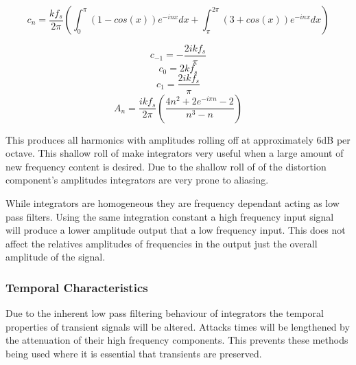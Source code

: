 			\[ c_{n} = \frac{kf_{s}}{2\pi} \left( \int_{0}^{\pi} (1 - cos(x))e^{-inx} dx +
							       \int_{\pi}^{2\pi} (3 + cos(x))e^{-inx} dx \right) \]

			\[ c_{-1} = - \frac{2ikf_{s}}{\pi} \]
			\[ c_{0} = 2kf_{s} \]
			\[ c_{1} = \frac{2ikf_{s}}{\pi} \]
			\begin{equation}
				A_{n} = \frac{ikf_{s}}{2\pi} \left( \frac{4n^{2} + 2e^{-i\pi n} - 2}{n^{3} - n} \right)
				\label{eq:IntegratorFourier}
			\end{equation}

			This produces all harmonics with amplitudes rolling off at approximately 6dB per octave. This
			shallow roll of make integrators very useful when a large amount of new frequency content is
			desired. Due to the shallow roll of of the distortion component's amplitudes integrators are very
			prone to aliasing.

			While integrators are homogeneous they are frequency dependant acting as low pass filters. Using
			the same integration constant a high frequency input signal will produce a lower amplitude output
			that a low frequency input. This does not affect the relatives amplitudes of frequencies in the
			output just the overall amplitude of the signal.

		\subsubsection*{Temporal Characteristics}
			Due to the inherent low pass filtering behaviour of integrators the temporal properties of
			transient signals will be altered. Attacks times will be lengthened by the attenuation of their
			high frequency components. This prevents these methods being used where it is essential that
			transients are preserved. 
			



